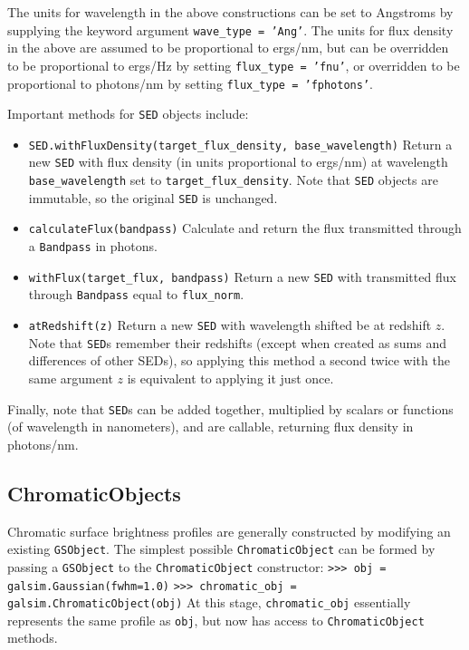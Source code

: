 \documentclass[preprint,11pt]{../../devel/modules/aastex}
\begin{document}
The units for wavelength in the above constructions can be set to Angstroms by supplying the keyword
argument \texttt{wave\_type = 'Ang'}.  The units for flux density in the above are assumed to be
proportional to ergs/nm, but can be overridden to be proportional to ergs/Hz by setting
\texttt{flux\_type = 'fnu'}, or overridden to be proportional to photons/nm by setting
\texttt{flux\_type = 'fphotons'}.

Important methods for \texttt{SED} objects include:
\begin{itemize}
\item {\tt SED.withFluxDensity(target\_flux\_density, base\_wavelength)} \newline Return a new
  \texttt{SED} with flux density (in units proportional to ergs/nm) at wavelength
  \texttt{base\_wavelength} set to \texttt{target\_flux\_density}.  Note that \texttt{SED} objects
   are immutable, so the original \texttt{SED} is unchanged.
\item {\tt calculateFlux(bandpass)} Calculate and return the flux transmitted through a
  \texttt{Bandpass} in photons.
\item {\tt withFlux(target\_flux, bandpass)} Return a new \texttt{SED} with transmitted flux
  through \texttt{Bandpass} equal to \texttt{flux\_norm}.
\item {\tt atRedshift(z)} Return a new \texttt{SED} with wavelength shifted be at redshift $z$.
  Note that \texttt{SED}s remember their redshifts (except when created as sums and differences of
  other SEDs), so applying this method a second twice with the same argument $z$ is equivalent to
  applying it just once.
\end{itemize}

Finally, note that \texttt{SED}s can be added together, multiplied by scalars or functions (of
wavelength in nanometers), and are callable, returning flux density in photons/nm.

\subsection{ChromaticObjects}

Chromatic surface brightness profiles are generally constructed by modifying an existing
\texttt{GSObject}.  The simplest possible \texttt{ChromaticObject} can be formed by passing a
\texttt{GSObject} to the \texttt{ChromaticObject} constructor:
\newline
{\tt >>> obj = galsim.Gaussian(fwhm=1.0)}\newline
{\tt >>> chromatic\_obj = galsim.ChromaticObject(obj)}\newline
At this stage, \texttt{chromatic\_obj} essentially represents the same profile as \texttt{obj}, but
now has access to \texttt{ChromaticObject} methods.
\end{document}
